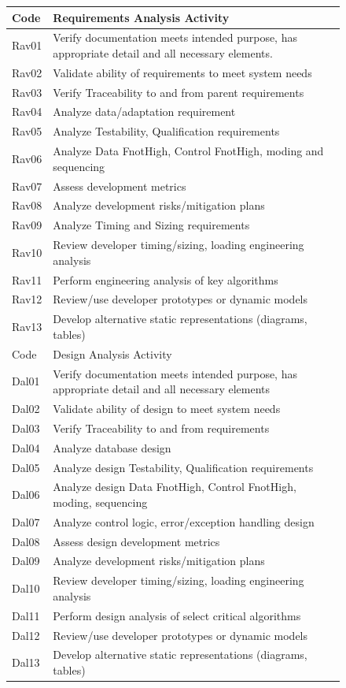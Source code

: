 \documentclass[twocolumn]{styles/IEEEtran}
\begin{document}
\begin{figure}[h]
 \begin{tiny} 
 \begin{center}
 \begin{tabular}[t]{|l@{ }|l@{ }|} \hline
Code 	& Requirements Analysis Activity\\ \hline
Rav01	&Verify documentation meets intended purpose, has appropriate detail and all necessary elements. \\
Rav02	&Validate ability of requirements to meet system needs \\
Rav03	&Verify Traceability to and from parent requirements \\
Rav04	&Analyze data/adaptation requirement \\
Rav05	&Analyze Testability, Qualification requirements \\
Rav06	&Analyze Data FnotHigh, Control FnotHigh, moding and sequencing \\
Rav07	&Assess development metrics \\
Rav08	&Analyze development risks/mitigation plans \\
Rav09	&Analyze Timing and Sizing requirements \\
Rav10	&Review developer timing/sizing, loading engineering analysis \\
Rav11	&Perform engineering analysis of key algorithms \\
Rav12	&Review/use developer prototypes or dynamic models \\
Rav13	&Develop alternative static representations (diagrams, tables) \\ \hline

Code 	& Design Analysis Activity	\\  \hline
Dal01	&Verify documentation meets intended purpose, has appropriate detail and all necessary elements \\
Dal02	&Validate ability of design to meet system needs \\
Dal03	&Verify Traceability to and from requirements \\
Dal04	&Analyze database design \\
Dal05	&Analyze design Testability, Qualification requirements \\
Dal06	&Analyze design Data FnotHigh, Control FnotHigh, moding, sequencing \\
Dal07	&Analyze control logic, error/exception handling design \\
Dal08	&Assess design development metrics \\
Dal09	&Analyze development risks/mitigation plans \\
Dal10	&Review developer timing/sizing, loading engineering analysis \\
Dal11	&Perform design analysis of select critical algorithms \\
Dal12	&Review/use developer prototypes or dynamic models \\
Dal13	&Develop alternative static representations (diagrams, tables) \\


\end{tabular}
\end{center}
\end{tiny}
\end{figure}
\end{document}
